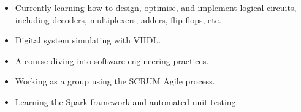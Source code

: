 \vspace{1.5pt} %


{
\begin{itemize}
    \item Currently learning how to design, optimise, and implement logical circuits, including decoders, multiplexers, adders, flip flops, etc.
    \item Digital system simulating with VHDL.
\end{itemize}
}
{
\begin{itemize}
    \item A course diving into software engineering practices.
    \item Working as a group using the SCRUM Agile process.
    \item Learning the Spark framework and automated unit testing.
\end{itemize}
}

\medskip
{}
\medskip
{}


